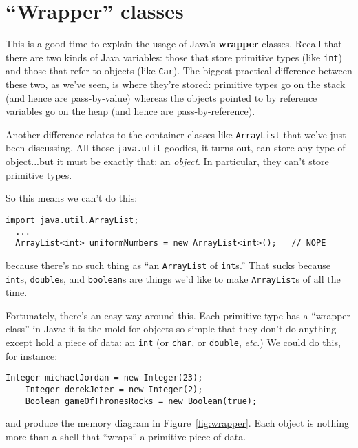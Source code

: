 \section{``Wrapper'' classes}

This is a good time to explain the usage of Java's \textbf{wrapper} classes.
Recall that there are two kinds of Java variables: those that store primitive
types (like \texttt{int}) and those that refer to objects (like \texttt{Car}).
The biggest practical difference between these two, as we've seen, is where
they're stored: primitive types go on the stack (and hence are pass-by-value)
whereas the objects pointed to by reference variables go on the heap (and
hence are pass-by-reference).

Another difference relates to the container classes like \texttt{ArrayList}
that we've just been discussing. All those \texttt{java.util} goodies, it
turns out, can store any type of object...but it must be exactly that: an
\textit{object}. In particular, they can't store primitive types.

So this means we can't do this:

\begin{Verbatim}[fontsize=\footnotesize,samepage=true]
  import java.util.ArrayList;
  ...
  ArrayList<int> uniformNumbers = new ArrayList<int>();   // NOPE
\end{Verbatim}

because there's no such thing as ``an \texttt{ArrayList} of \texttt{int}s.''
That sucks because \texttt{int}s, \texttt{double}s, and \texttt{boolean}s are
things we'd like to make \texttt{ArrayList}s of all the time.

Fortunately, there's an easy way around this. Each primitive type has a
``wrapper class'' in Java: it is the mold for objects so simple that they don't
do anything except hold a piece of data: an \texttt{int} (or \texttt{char}, or
\texttt{double}, \textit{etc.}) We could do this, for instance:

\begin{Verbatim}[fontsize=\small,samepage=true]
    Integer michaelJordan = new Integer(23);
    Integer derekJeter = new Integer(2);
    Boolean gameOfThronesRocks = new Boolean(true);
\end{Verbatim}

and produce the memory diagram in Figure~\ref{fig:wrapper}. Each object is
nothing more than a shell that ``wraps'' a primitive piece of data.

